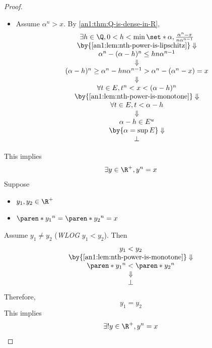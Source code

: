 \begin{proof}
\begin{itemize}
\[          \]
    \item Assume $\alpha^{n} > x$. By \cref{an1:thm:Q-is-dense-in-R},
          \[
            \begin{array}{c}
              \exists h \in \Q, 0 < h < \min\set*{\alpha, \frac{\alpha^{n} - x}{n\alpha^{n - 1}}}     \\
              \by{\Cref{an1:lem:nth-power-is-lipschitz}} \Downarrow                                   \\
              \alpha^{n} - (\alpha - h)^{n} \leq hn\alpha^{n - 1}                                     \\
              \Downarrow                                                                              \\
              (\alpha - h)^{n} \geq \alpha^{n} - hn\alpha^{n - 1} > \alpha^{n} - (\alpha^{n} - x) = x \\
              \Downarrow                                                                              \\
              \forall t \in E, t^{n} < x < (\alpha - h)^{n}                                           \\
              \by{\Cref{an1:lem:nth-power-is-monotone}} \Downarrow                                    \\
              \forall t \in E, t < \alpha - h                                                         \\
              \Downarrow                                                                              \\
              \alpha - h \in E^{u}                                                                    \\
              \by{\ensuremath{\alpha = \sup E}} \Downarrow                                            \\
              \bot
            \end{array}
          \]
  \end{itemize}
  This implies
  \[
    \exists y \in \R^{+}, y^{n} = x
  \]
  Suppose
  \begin{itemize}
    \item $y_{1}, y_{2} \in \R^{+}$
    \item $\paren*{y_{1}}^{n} = \paren*{y_{2}}^{n} = x$
  \end{itemize}
  Assume $y_{1} \neq y_{2}$ (\emph{WLOG} $y_{1} < y_{2}$). Then
  \[
    \begin{array}{c}
      y_{1} < y_{2}                                        \\
      \by{\Cref{an1:lem:nth-power-is-monotone}} \Downarrow \\
      \paren*{y_{1}}^{n} < \paren*{y_{2}}^{n}              \\
      \Downarrow                                           \\
      \bot
    \end{array}
  \]
  Therefore,
  \[
    y_{1} = y_{2}
  \]
  This implies
  \[
    \exists! y \in \R^{+}, y^{n} = x
  \]
\end{proof}

